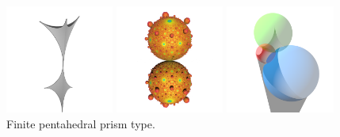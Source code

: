 \begin{figure}[h!tbp]
 \begin{minipage}[t]{0.5\textwidth}
  \begin{minipage}[t]{0.24\textwidth}
   \centering
   \includegraphics[width=1.4in, height=1.4in, keepaspectratio]{./img/application/sphairahedron/variations/pentahedralPrism/finiteSphairahedron.png}
  \end{minipage}
  \hspace*{\fill}
  \begin{minipage}[t]{0.24\textwidth}
   \centering
   \includegraphics[width=1.4in, height=1.4in, keepaspectratio]{./img/application/sphairahedron/variations/pentahedralPrism/finiteLimitset.png}
  \end{minipage}
  \hspace*{\fill}
  \caption{Finite pentahedral prism type.}
  \label{fig:semi-finite}
 \end{minipage}
 \begin{minipage}[t]{0.5\textwidth}
  \begin{minipage}[t]{0.24\textwidth}
   \centering
   \includegraphics[width=1.4in, height=1.4in, keepaspectratio]
   {./img/application/sphairahedron/variations/cube/prismType3.png}
  \end{minipage}
  \hspace*{\fill}

\end{minipage}
\end{figure}
